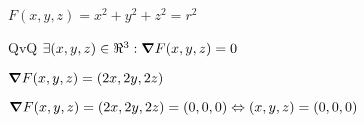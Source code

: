 \documentclass[../practica_04.tex]{subfiles}
\begin{document}
    $ F(x,y,z) = x^2 + y^2 + z^2 = r^2 $

    QvQ $ \exists (x,y,z) \in \real^3 : \grad F(x,y,z) = 0$

    $ \grad F(x,y,z) = (2x, 2y, 2z) $

    $ \grad F(x,y,z) = (2x, 2y, 2z) = (0,0,0) \Leftrightarrow (x,y,z) = (0,0,0) $
\end{document}
